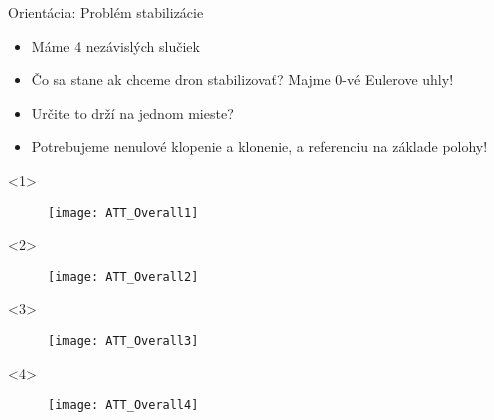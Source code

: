 \begin{frame}[t]{Orientácia: Problém stabilizácie}\
\begin{itemize}
  \item<1-> Máme 4 nezávislých slučiek
  \item<2-> Čo sa stane ak chceme dron stabilizovať? Majme 0-vé Eulerove uhly!
  \item<3-> Určite to drží na jednom mieste? 
  \item<4-> Potrebujeme nenulové klopenie a klonenie, a referenciu na základe polohy!
\end{itemize}
  \begin{onlyenv}<1>
\begin{figure}
\centering
  \texttt{[image: ATT\_Overall1]}\\
\end{figure}
  \end{onlyenv}
    \begin{onlyenv}<2>
\begin{figure}
\centering
  \texttt{[image: ATT\_Overall2]}\\
\end{figure}
  \end{onlyenv}
      \begin{onlyenv}<3>
\begin{figure}
\centering
  \texttt{[image: ATT\_Overall3]}\\
\end{figure}
  \end{onlyenv}
        \begin{onlyenv}<4>
\begin{figure}
\centering
  \texttt{[image: ATT\_Overall4]}\\
\end{figure}
  \end{onlyenv}
  
\end{frame}
